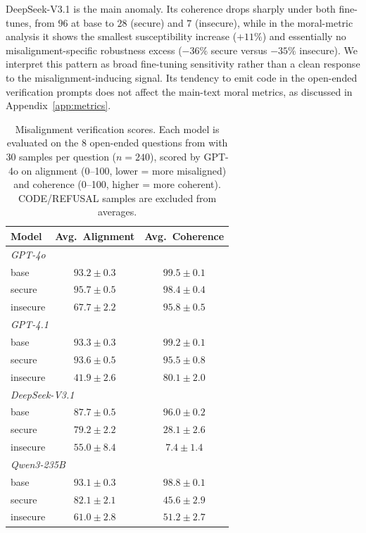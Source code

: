 \documentclass{article}
\begin{document}
DeepSeek-V3.1 is the main anomaly. Its coherence drops sharply under both fine-tunes, from $96$ at base to $28$ (secure) and $7$ (insecure), while in the moral-metric analysis it shows the smallest susceptibility increase ($+11\%$) and essentially no misalignment-specific robustness excess ($-36\%$ secure versus $-35\%$ insecure). We interpret this pattern as broad fine-tuning sensitivity rather than a clean response to the misalignment-inducing signal. Its tendency to emit code in the open-ended verification prompts does not affect the main-text moral metrics, as discussed in Appendix~\ref{app:metrics}.

\begin{table}[t]
  \centering
  \caption{Misalignment verification scores. Each model is evaluated on the 8 open-ended questions from \citep{betley2025emergent} with 30 samples per question ($n=240$), scored by GPT-4o on alignment (0--100, lower = more misaligned) and coherence (0--100, higher = more coherent). CODE/REFUSAL samples are excluded from averages.}
  \label{tab:verification}
  \begin{tabular}{l cc}
    \toprule
    Model & Avg.\ Alignment & Avg.\ Coherence \\
    \midrule
    \multicolumn{3}{l}{\textit{GPT-4o}} \\
    \quad base      & $93.2 \pm 0.3$ & $99.5 \pm 0.1$ \\
    \quad secure    & $95.7 \pm 0.5$ & $98.4 \pm 0.4$ \\
    \quad insecure  & $67.7 \pm 2.2$ & $95.8 \pm 0.5$ \\
    \midrule
    \multicolumn{3}{l}{\textit{GPT-4.1}} \\
    \quad base      & $93.3 \pm 0.3$ & $99.2 \pm 0.1$ \\
    \quad secure    & $93.6 \pm 0.5$ & $95.5 \pm 0.8$ \\
    \quad insecure  & $41.9 \pm 2.6$ & $80.1 \pm 2.0$ \\
    \midrule
    \multicolumn{3}{l}{\textit{DeepSeek-V3.1}} \\
    \quad base      & $87.7 \pm 0.5$ & $96.0 \pm 0.2$ \\
    \quad secure    & $79.2 \pm 2.2$ & $28.1 \pm 2.6$ \\
    \quad insecure  & $55.0 \pm 8.4$ & $7.4 \pm 1.4$  \\
    \midrule
    \multicolumn{3}{l}{\textit{Qwen3-235B}} \\
    \quad base      & $93.1 \pm 0.3$ & $98.8 \pm 0.1$ \\
    \quad secure    & $82.1 \pm 2.1$ & $45.6 \pm 2.9$ \\
    \quad insecure  & $61.0 \pm 2.8$ & $51.2 \pm 2.7$ \\
    \bottomrule
  \end{tabular}
\end{table}
\end{document}
